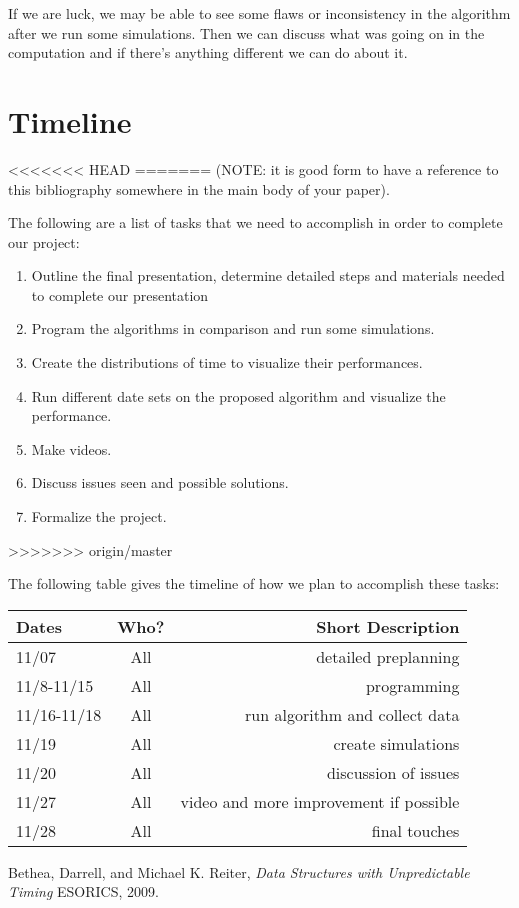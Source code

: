 \documentclass[11pt,twocolumn]{article}
\begin{document}
If we are luck, we may be able to see some flaws or inconsistency in the algorithm after we run some simulations. Then we can discuss what was going on in the computation and if there's anything different we can do about it.


%
% 

\newpage
\onecolumn
\appendix
\section{Timeline}
<<<<<<< HEAD
=======
(NOTE: it is good form to have a reference to this bibliography somewhere in 
the main body of your paper).

The following are a list of tasks that we need to accomplish in order to 
complete our project:

\begin{enumerate}
\item Outline the final presentation, determine detailed steps and
materials needed to complete our presentation

\item Program the algorithms in comparison and run some simulations.

\item Create the distributions of time to visualize their performances.

\item Run different date sets on the proposed algorithm and visualize the performance.

\item Make videos.

\item Discuss issues seen and possible solutions.

\item Formalize the project.
\end{enumerate}
>>>>>>> origin/master

The following table gives the timeline of how we plan to accomplish these tasks:

\begin{table}[h!]
\centering
\begin{tabular}{ |l | c | r|}
  \hline
  Dates & Who? & Short Description \\
  \hline
  \hline
  
  \hline
  11/07 & All & detailed preplanning \\
  \hline
  11/8-11/15 & All & programming \\
  \hline
  11/16-11/18 & All & run algorithm and collect data \\
  \hline
  11/19 & All & create simulations \\
  \hline
  11/20 & All & discussion of issues \\
  \hline
  11/27 & All & video and more improvement if possible \\
  \hline
  11/28 & All & final touches \\
  \hline
\end{tabular}
\end{table}

\pagebreak

\begin{thebibliography}{9}
	
	Bethea, Darrell, and Michael K. Reiter,
	\emph{Data Structures with Unpredictable Timing}
	ESORICS,
	2009.
	
\end{thebibliography}
\end{document}
